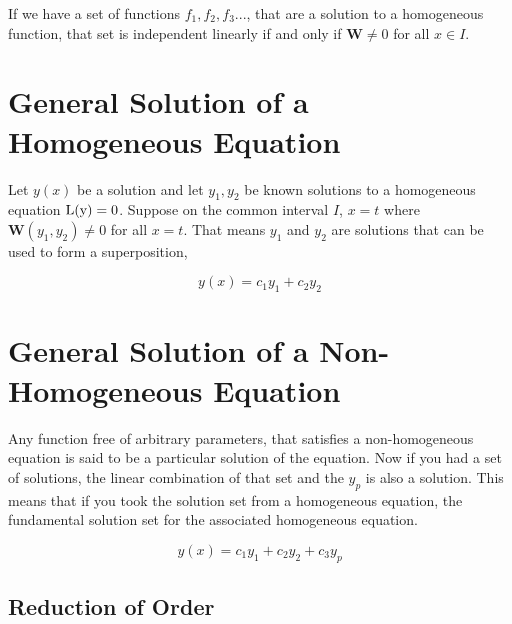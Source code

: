 If we have a set of functions $f_1, f_2, f_3 ...$, that are a solution to a homogeneous function, that set is independent linearly if and only if $\mathbf{W} \neq 0$ for all $x \in I$.

\section{General Solution of a Homogeneous Equation}
Let $y(x)$ be a solution and let $y_1,y_2$ be known solutions to a homogeneous equation $\mathrm{L(y)}=0$. Suppose on the common interval $I$, $x=t$ where $\mathbf{W}(y_1,y_2) \neq 0$ for all $x=t$. That means $y_1$ and $y_2$ are solutions that can be used to form a superposition, 

\begin{equation*}
	y(x) = c_1y_1 + c_2y_2
\end{equation*}

\section{General Solution of a Non-Homogeneous Equation}
Any function free of arbitrary parameters, that satisfies a non-homogeneous equation is said to be a particular solution of the equation. 
Now if you had a set of solutions, the linear combination of that set and the $y_p$ is also a solution. This means that if you took the solution set from a homogeneous equation, the fundamental solution set for the associated homogeneous equation.

\begin{equation*}
	y(x) = c_1y_1 + c_2y_2 + c_3y_p 
\end{equation*}

\subsection{Reduction of Order}
